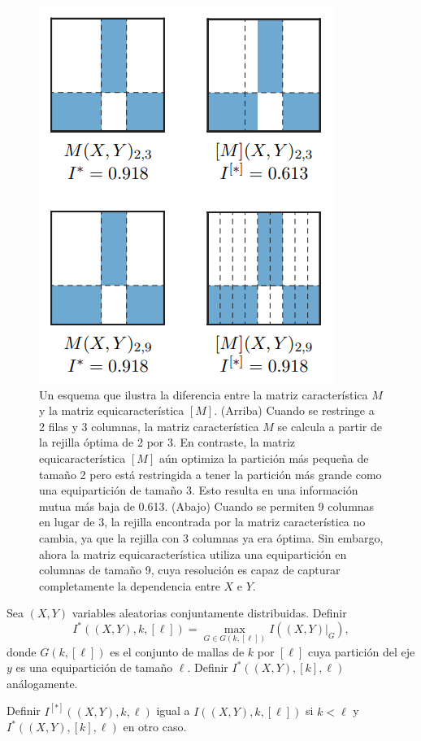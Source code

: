         \begin{figure} 
            \centering
            \includegraphics[scale=0.8]{figuras/figure_1_reshef_2016.png}
            \caption{Un esquema que ilustra la diferencia entre la matriz caracter\'istica $M$ y la matriz equicaracter\'istica $[M]$. (Arriba) Cuando se restringe a 2 filas y 3 columnas, la matriz caracter\'istica $M$ se calcula a partir de la rejilla \'optima de 2 por 3. En contraste, la matriz equicaracter\'istica $[M]$ a\'un optimiza la partici\'on m\'as peque\~na de tama\~no 2 pero est\'a restringida a tener la partici\'on m\'as grande como una equipartici\'on de tama\~no 3. Esto resulta en una informaci\'on mutua m\'as baja de 0.613. (Abajo) Cuando se permiten 9 columnas en lugar de 3, la rejilla encontrada por la matriz caracter\'istica no cambia, ya que la rejilla con 3 columnas ya era \'optima. Sin embargo, ahora la matriz equicaracter\'istica utiliza una equipartici\'on en columnas de tama\~no 9, cuya resoluci\'on es capaz de capturar completamente la dependencia entre $X$ e $Y$.}
            \label{fig:matriz_equicaracteristica}
        \end{figure}
        
    
        \begin{defn}
            Sea $(X, Y)$ variables aleatorias conjuntamente distribuidas. Definir
            $$
            I^*((X, Y), k,[\ell])=\max _{G \in G(k,[\ell])} I\left(\left.(X, Y)\right|_G\right),
            $$
            donde $G(k,[\ell])$ es el conjunto de mallas de $k$ por $[\ell]$ cuya partici\'on del eje $y$ es una equipartici\'on de tama\~no $\ell$. Definir $I^*((X, Y),[k], \ell)$ an\'alogamente.
    
            Definir $I^{[*]}((X, Y), k, \ell)$ igual a $I((X, Y), k,[\ell])$ si $k<\ell$ y $I^*((X, Y),[k], \ell)$ en otro caso.
        \end{defn}
    
